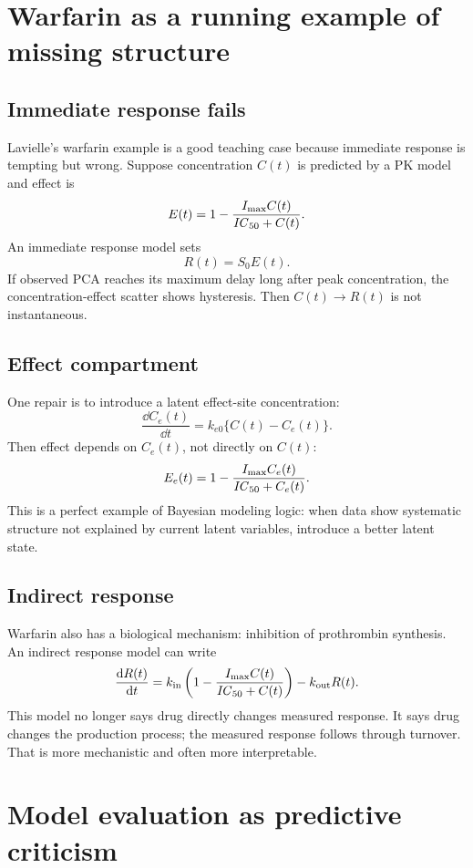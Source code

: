 \documentclass[a4paper]{article}
\begin{document}
\section{Warfarin as a running example of missing structure}

\subsection{Immediate response fails}

Lavielle's warfarin example is a good teaching case because immediate response is tempting but wrong. Suppose concentration \(C(t)\) is predicted by a PK model and effect is
\[
  E(t)
  =
  1-
  \frac{I_{\max}C(t)}{\pksym{IC}_{50}+C(t)}.
\]
An immediate response model sets
\[
  R(t)=S_0E(t).
\]
If observed PCA reaches its maximum delay long after peak concentration, the concentration-effect scatter shows hysteresis. Then \(C(t)\to R(t)\) is not instantaneous.

\subsection{Effect compartment}

One repair is to introduce a latent effect-site concentration:
\[
  \frac{\dd C_e(t)}{\dd t}
  =
  k_{e0}\{C(t)-C_e(t)\}.
\]
Then effect depends on \(C_e(t)\), not directly on \(C(t)\):
\[
  E_e(t)
  =
  1-
  \frac{I_{\max}C_e(t)}{\pksym{IC}_{50}+C_e(t)}.
\]
This is a perfect example of Bayesian modeling logic: when data show systematic structure not explained by current latent variables, introduce a better latent state.

\subsection{Indirect response}

Warfarin also has a biological mechanism: inhibition of prothrombin synthesis. An indirect response model can write
\[
  \frac{\dd R(t)}{\dd t}
  =
  k_{\mathrm{in}}
  \left(
    1-\frac{I_{\max}C(t)}{\pksym{IC}_{50}+C(t)}
  \right)
  -
  k_{\mathrm{out}}R(t).
\]
This model no longer says drug directly changes measured response. It says drug changes the production process; the measured response follows through turnover. That is more mechanistic and often more interpretable.

\section{Model evaluation as predictive criticism}
\end{document}
